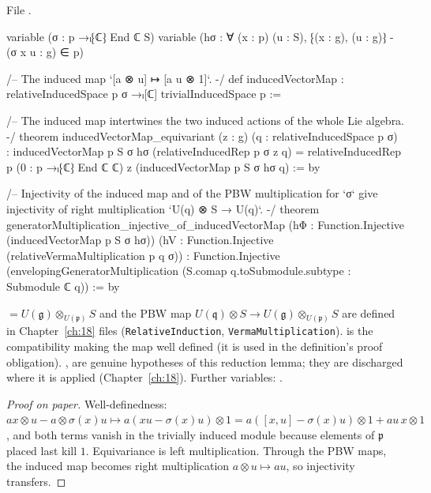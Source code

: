 \noindent File .
\begin{leancode}
variable (σ : p →ₗ⁅ℂ⁆ End ℂ S)
variable (hσ : ∀ (x : p) (u : S), ⁅(x : g), (u : g)⁆ - (σ x u : g) ∈ p)

/-- The induced map `[a ⊗ u] ↦ [a u ⊗ 1]`. -/
def inducedVectorMap : relativeInducedSpace p σ →ₗ[ℂ] trivialInducedSpace p :=

/-- The induced map intertwines the two induced actions of the whole Lie algebra. -/
theorem inducedVectorMap_equivariant (z : g) (q : relativeInducedSpace p σ) :
    inducedVectorMap p S σ hσ (relativeInducedRep p σ z q) =
      relativeInducedRep p (0 : p →ₗ⁅ℂ⁆ End ℂ ℂ) z (inducedVectorMap p S σ hσ q) := by

/-- Injectivity of the induced map and of the PBW multiplication for `σ` give injectivity of
right multiplication `U(q) ⊗ S → U(q)`. -/
theorem generatorMultiplication_injective_of_inducedVectorMap
    (hΦ : Function.Injective (inducedVectorMap p S σ hσ))
    (hV : Function.Injective (relativeVermaMultiplication p q σ)) :
    Function.Injective
      (envelopingGeneratorMultiplication (S.comap q.toSubmodule.subtype : Submodule ℂ q)) := by
\end{leancode}

\begin{dictionary}
 $=U(\mathfrak g)\otimes_{U(\mathfrak p)}S$ and  the PBW map
$U(\mathfrak q)\otimes S\to U(\mathfrak g)\otimes_{U(\mathfrak p)}S$ are defined in Chapter~\ref{ch:18} files
(\texttt{RelativeInduction}, \texttt{VermaMultiplication}).   is the compatibility making the map well defined (it is
used in the definition's proof obligation).  ,  are genuine hypotheses of this reduction lemma; they are
discharged where it is applied (Chapter~\ref{ch:18}).  Further variables: .
\end{dictionary}

\begin{proof}[Proof on paper]
Well-definedness: $a x\otimes u-a\otimes\sigma(x)u\mapsto a(xu-\sigma(x)u)\otimes1=a([x,u]-\sigma(x)u)\otimes1+au\,x\otimes1$, and both terms
vanish in the trivially induced module because elements of $\mathfrak p$ placed last kill $1$.  Equivariance is left
multiplication.  Through the PBW maps, the induced map becomes right multiplication $a\otimes u\mapsto au$, so injectivity transfers.
\end{proof}


